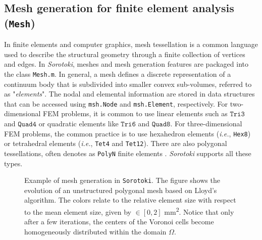 \subsection{Mesh generation for finite element analysis (\texttt{Mesh})}
\label{sec:C5:mesh}
In finite elements and computer graphics, mesh tessellation is a common language used to describe the structural geometry through a finite collection of vertices and edges. In \textit{Sorotoki}, meshes and mesh generation features are packaged into the class \texttt{Mesh.m}. In general, a mesh defines a discrete representation of a continuum body that is subdivided into smaller convex sub-volumes, referred to as "\textit{elements}". The nodal and elemental information are stored in data structures that can be accessed using \texttt{msh.Node} and \texttt{msh.Element}, respectively. For two-dimensional FEM problems, it is common to use linear elements such as $\texttt{Tri3}$ and $\texttt{Quad4}$ or quadratic elements like $\texttt{Tri6}$ and $\texttt{Quad8}$. For three-dimensional FEM problems, the common practice is to use hexahedron elements (\textit{i.e.}, \texttt{Hex8}) or tetrahedral elements (\textit{i.e.}, \texttt{Tet4} and \texttt{Tet12}). There are also polygonal tessellations, often denotes as \texttt{PolyN} finite elements \cite{Talischi2012Mar}. \textit{Sorotoki} supports all these types.
%
\begin{figure}[!t]
    \centering
    \vspace{-3mm}
    \caption{Example of mesh generation in \texttt{Sorotoki}. The figure shows the evolution of an unstructured polygonal mesh based on Lloyd's algorithm. The colors relate to the relative element size with respect to the mean element size, given by \protect{}$\!\!\in [0,2]$ \si{\milli \meter \squared}. Notice that only after a few iterations, the centers of the Voronoi cells become homogeneously distributed within the domain $\Omega$.}
    \label{fig:sorotoki:meshexample}
    \vspace{-3mm}
\end{figure}

